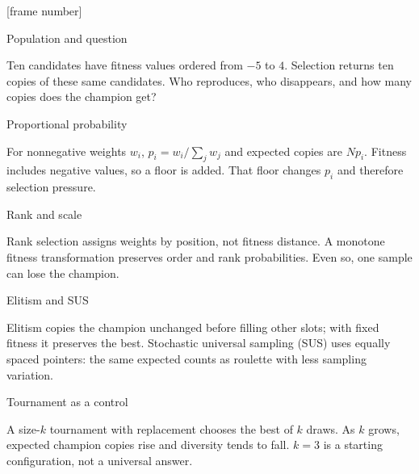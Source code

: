 


[frame number]

\date{}




\begin{frame}{Population and question}

Ten candidates have fitness values ordered from $-5$ to $4$. Selection returns ten copies of these same candidates. Who reproduces, who disappears, and how many copies does the champion get?

\end{frame}

\begin{frame}{Proportional probability}

For nonnegative weights $w_i$, $p_i=w_i/\sum_j w_j$ and expected copies are $Np_i$. Fitness includes negative values, so a floor is added. That floor changes $p_i$ and therefore selection pressure.

\end{frame}

\begin{frame}{Rank and scale}

Rank selection assigns weights by position, not fitness distance. A monotone fitness transformation preserves order and rank probabilities. Even so, one sample can lose the champion.

\end{frame}

\begin{frame}{Elitism and SUS}

Elitism copies the champion unchanged before filling other slots; with fixed fitness it preserves the best. Stochastic universal sampling (SUS) uses equally spaced pointers: the same expected counts as roulette with less sampling variation.

\end{frame}

\begin{frame}{Tournament as a control}

A size-$k$ tournament with replacement chooses the best of $k$ draws. As $k$ grows, expected champion copies rise and diversity tends to fall. $k=3$ is a starting configuration, not a universal answer.

\end{frame}

